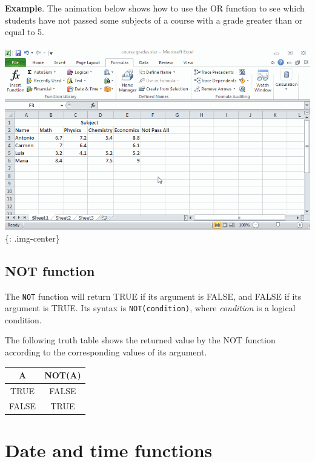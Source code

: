 \textbf{Example}. The animation below shows how to use the OR function to see which students have not passed some subjects of a course with a grade greater than or equal to 5.

\includegraphics[keepaspectratio,width=\textwidth,height=0.75\textheight]{img/example_function_or.gif}
\{: .img-center\}

\section{NOT function}
\label{notfunction}

The \texttt{NOT} function will return TRUE if its argument is FALSE, and FALSE if its argument is TRUE. Its syntax is \texttt{NOT(condition)}, where \emph{condition} is a logical condition. 

The following truth table shows the returned value by the NOT function according to the corresponding values of its argument.

\begin{table}[htbp]
\begin{minipage}{\linewidth}
\setlength{\tymax}{0.5\linewidth}
\centering
\small
\begin{tabulary}{\textwidth}{@{}CC@{}} \toprule
A&NOT(A)\\
\midrule
TRUE&FALSE\\
FALSE&TRUE\\

\bottomrule

\end{tabulary}
\end{minipage}
\end{table}




\chapter{Date and time functions}
\label{dateandtimefunctions}

